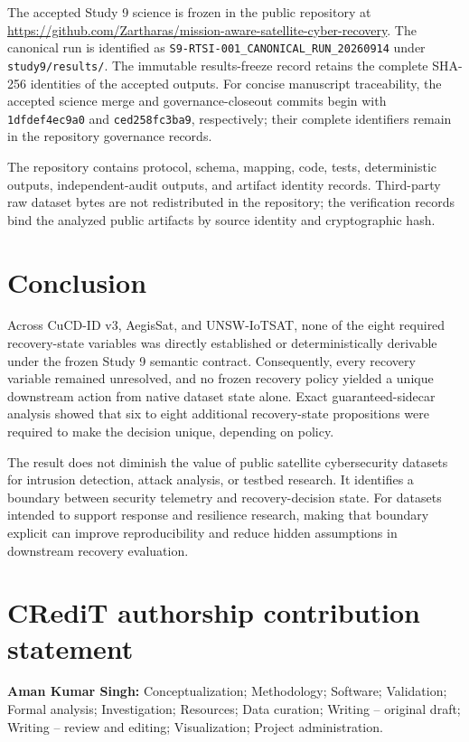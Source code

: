 \documentclass[preprint,12pt]{elsarticle}
\begin{document}
The accepted Study 9 science is frozen in the public repository at
\url{https://github.com/Zartharas/mission-aware-satellite-cyber-recovery}.
The canonical run is identified as
\texttt{S9-RTSI-001\_CANONICAL\_RUN\_20260914} under \texttt{study9/results/}.
The immutable results-freeze record retains the complete SHA-256 identities of the accepted outputs. For concise manuscript traceability, the accepted science merge and governance-closeout commits begin with \texttt{1dfdef4ec9a0} and \texttt{ced258fc3ba9}, respectively; their complete identifiers remain in the repository governance records.

The repository contains protocol, schema, mapping, code, tests, deterministic outputs, independent-audit outputs, and artifact identity records. Third-party raw dataset bytes are not redistributed in the repository; the verification records bind the analyzed public artifacts by source identity and cryptographic hash.

\section{Conclusion}

Across CuCD-ID v3, AegisSat, and UNSW-IoTSAT, none of the eight required recovery-state variables was directly established or deterministically derivable under the frozen Study 9 semantic contract. Consequently, every recovery variable remained unresolved, and no frozen recovery policy yielded a unique downstream action from native dataset state alone. Exact guaranteed-sidecar analysis showed that six to eight additional recovery-state propositions were required to make the decision unique, depending on policy.

The result does not diminish the value of public satellite cybersecurity datasets for intrusion detection, attack analysis, or testbed research. It identifies a boundary between security telemetry and recovery-decision state. For datasets intended to support response and resilience research, making that boundary explicit can improve reproducibility and reduce hidden assumptions in downstream recovery evaluation.

\section*{CRediT authorship contribution statement}

\textbf{Aman Kumar Singh:} Conceptualization; Methodology; Software; Validation; Formal analysis; Investigation; Resources; Data curation; Writing -- original draft; Writing -- review and editing; Visualization; Project administration.
\end{document}
